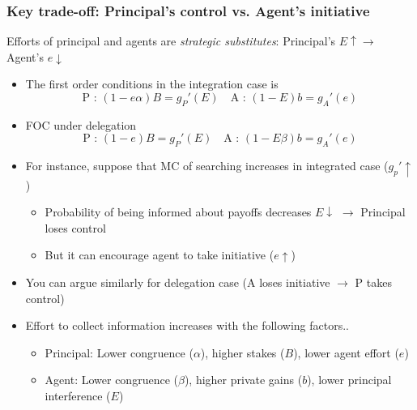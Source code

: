 \documentclass[aspectratio=169]{beamer}
\begin{document}
\begin{frame}
\frametitle{Key trade-off: Principal's control vs. Agent's initiative} 
Efforts of principal and agents are \textit{strategic substitutes}: Principal's $E\uparrow\to$ Agent's $e\downarrow$
\begin{itemize}\setlength\itemsep{3pt}
  \item The first order conditions in the integration case is \vspace{-10pt}
  \[
  \text{P : } (1-e\alpha)B = g_P'(E) \quad \text{A : } (1-E)b=g_A'(e)
  \]\vspace{-20pt}
  \item FOC under delegation \vspace{-10pt}
  \[
  \text{P : } (1-e)B = g_P'(E) \quad \text{A : } (1-E\beta)b=g_A'(e)
  \]\vspace{-20pt}

  \item For instance, suppose that MC of searching increases in integrated case  ($g_p'\uparrow$)
  \begin{itemize}\setlength\itemsep{3pt}
  \item Probability of being informed about payoffs decreases $E\downarrow$ $\to$ Principal loses control
  \item But it can encourage agent to take initiative ($e\uparrow$)
\end{itemize}
\item You can argue similarly for delegation case (A loses initiative $\to$ P takes control)
\item Effort to collect information increases with the following factors..
  \begin{itemize}\setlength\itemsep{3pt}
  \item Principal: Lower congruence ($\alpha$), higher stakes ($B$), lower agent effort ($e$)
  \item Agent:  Lower congruence ($\beta$), higher private gains ($b$), lower principal interference ($E$)
\end{itemize}
\end{itemize}\medskip
\end{frame}
\end{document}
